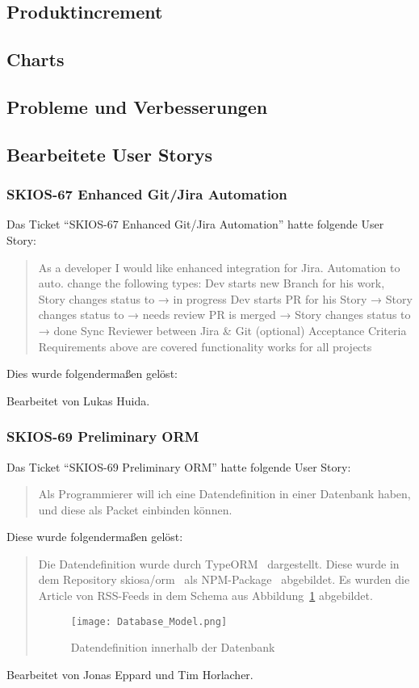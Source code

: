 \subsection{Produktincrement}
\subsection{Charts}
\subsection{Probleme und Verbesserungen}


\subsection{Bearbeitete User Storys}

\subsubsection{SKIOS-67 Enhanced Git/Jira Automation}
Das Ticket \enquote{SKIOS-67 Enhanced Git/Jira Automation} hatte folgende User Story:
\begin{quotation}
    As a developer I would like enhanced integration for Jira.
    Automation to auto. change the following types:
    Dev starts new Branch for his work, Story changes status to → in progress
    Dev starts PR for his Story → Story changes status to → needs review
    PR is merged → Story changes status to → done
    Sync Reviewer between Jira & Git (optional)
    Acceptance Criteria
    Requirements above are covered
    functionality works for all projects
\end{quotation}
Dies wurde folgendermaßen gelöst:
\begin{quotation}
    
\end{quotation}
Bearbeitet von Lukas Huida.

\subsubsection{SKIOS-69 Preliminary ORM}
Das Ticket \enquote{SKIOS-69 Preliminary ORM} hatte folgende User Story:
\begin{quotation}
    Als Programmierer will ich eine Datendefinition in einer Datenbank
    haben, und diese als Packet einbinden können.
\end{quotation}
Diese wurde folgendermaßen gelöst:
\begin{quotation}
Die Datendefinition wurde durch TypeORM~\parencite{web/TypeORM} dargestellt.
Diese wurde in dem Repository skiosa/orm~\parencite{git/skiosa/orm} als NPM-Package~\parencite{web/npm} abgebildet.
Es wurden die Article von RSS-Feeds in dem Schema aus Abbildung~\ref{fig:databaseORM} abgebildet.
\begin{figure}
    \texttt{[image: Database\_Model.png]}
    \caption{Datendefinition innerhalb der Datenbank}
    \label{fig:databaseORM}
\end{figure}
\end{quotation}
Bearbeitet von Jonas Eppard und Tim Horlacher.

